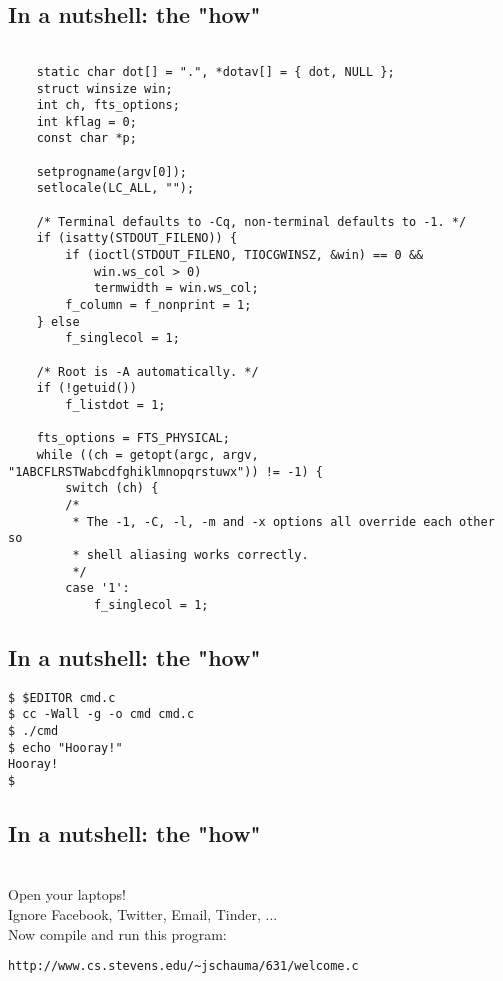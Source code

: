 \documentclass[sxga]{xdvislides}
\begin{document}
\subsection{In a nutshell: the "how"}
\small
\begin{verbatim}

    static char dot[] = ".", *dotav[] = { dot, NULL };
    struct winsize win;
    int ch, fts_options;
    int kflag = 0;
    const char *p;

    setprogname(argv[0]);
    setlocale(LC_ALL, "");

    /* Terminal defaults to -Cq, non-terminal defaults to -1. */
    if (isatty(STDOUT_FILENO)) {
        if (ioctl(STDOUT_FILENO, TIOCGWINSZ, &win) == 0 &&
            win.ws_col > 0)
            termwidth = win.ws_col;
        f_column = f_nonprint = 1;
    } else
        f_singlecol = 1;

    /* Root is -A automatically. */
    if (!getuid())
        f_listdot = 1;

    fts_options = FTS_PHYSICAL;
    while ((ch = getopt(argc, argv, "1ABCFLRSTWabcdfghiklmnopqrstuwx")) != -1) {
        switch (ch) {
        /*
         * The -1, -C, -l, -m and -x options all override each other so
         * shell aliasing works correctly.
         */
        case '1':
            f_singlecol = 1;
\end{verbatim}
\Normalsize

\subsection{In a nutshell: the "how"}
\begin{verbatim}
$ $EDITOR cmd.c
$ cc -Wall -g -o cmd cmd.c
$ ./cmd
$ echo "Hooray!"
Hooray!
$
\end{verbatim}

\subsection{In a nutshell: the "how"}
\\

\Hugesize
Open your laptops! \\
\small
Ignore Facebook, Twitter, Email, Tinder, ... \\

\Hugesize
Now compile and run this program: \\
\begin{verbatim}
http://www.cs.stevens.edu/~jschauma/631/welcome.c
\end{verbatim}
\Normalsize
\end{document}
